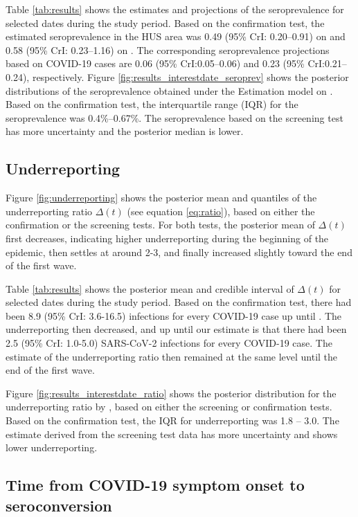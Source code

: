 \documentclass[aoas]{imsart}
\begin{document}
Table \ref{tab:results} shows the estimates and projections of the seroprevalence for selected dates during the study period. Based on the confirmation test, the estimated seroprevalence in the HUS area was 0.49 (95\% CrI: 0.20–0.91) on  and 0.58 (95\% CrI: 0.23–1.16) on . The corresponding seroprevalence projections based on COVID-19 cases are 0.06 (95\% CrI:0.05–0.06) and 0.23 (95\% CrI:0.21–0.24), respectively. Figure \ref{fig:results_interestdate_seroprev} shows the posterior distributions of the seroprevalence obtained under the Estimation model on . Based on the confirmation test, the interquartile range (IQR) for the seroprevalence was 0.4\%–0.67\%. The seroprevalence based on the screening test has more uncertainty and the posterior median is lower.

\subsection{Underreporting}

Figure \ref{fig:underreporting} shows the posterior mean and quantiles of the underreporting ratio $\Delta(t)$ (see equation \ref{eq:ratio}), based on either the confirmation or the screening tests. For both tests, the posterior mean of $\Delta(t)$ first decreases, indicating higher underreporting during the beginning of the epidemic, then settles at around 2-3, and finally increased slightly toward the end of the first wave.

Table \ref{tab:results} shows the posterior mean and credible interval of $\Delta(t)$ for selected dates during the study period. Based on the confirmation test, there had been 8.9 (95\% CrI: 3.6-16.5) infections for every COVID-19 case up until . The underreporting then decreased, and up until  our estimate is that there had been 2.5 (95\% CrI: 1.0-5.0) SARS-CoV-2 infections for every COVID-19 case. The estimate of the underreporting ratio then remained at the same level until the end of the first wave.

Figure \ref{fig:results_interestdate_ratio} shows the posterior distribution for the underreporting ratio by , based on either the screening or confirmation tests. Based on the confirmation test, the IQR for underreporting was 1.8 – 3.0. The estimate derived from the screening test data has more uncertainty and shows lower underreporting.


\subsection{Time from COVID-19 symptom onset to seroconversion}
\end{document}

